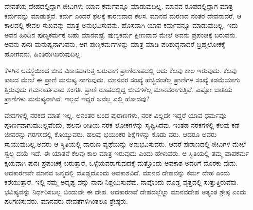 ದೇವತೆಯ ದೇಹದಲ್ಲಿದ್ದಾಗ ಜೀವಿಗಳು ಯಾವ ಕರ್ಮವನ್ನೂ ಮಾಡುವುದಿಲ್ಲ. ಮಾನವ ರೂಪದಲ್ಲಿದ್ದಾಗ ಮಾತ್ರ ಕರ್ಮವನ್ನು ಮಾಡುತ್ತವೆ. ಕರ್ಮ ಎಂದರೆ ಫಲಕ್ಕೆ ಕಾರಣವಾದ ಕೆಲಸ. ಮಾನವ ಮರಣದ ನಂತರ ದೇವನಾದರೆ, ಆ ಕಾಲದಲ್ಲಿ ಕೇವಲ ಸುಖವನ್ನು ಮಾತ್ರ ಅನುಭವಿಸುವನು. ಹೊಸದಾಗಿ ಯಾವ ಕರ್ಮವನ್ನೂ ಮಾಡುವುದಿಲ್ಲ. ಇದು ಅವನ ಹಿಂದಿನ ಪುಣ್ಯಕರ್ಮಕ್ಕೆ ಬಹು ಮಾನವಷ್ಟೆ. ಪುಣ್ಯಕರ್ಮ ಕ್ಷೀಣವಾದ ಮೇಲೆ ಅವನು ಪ್ರಪಂಚಕ್ಕೆ ಬರುವನು. ಅವನು ಪುನಃ ಮನುಷ್ಯನಾಗುವನು, ಆಗ ಪುಣ್ಯಕರ್ಮಗಳನ್ನು ಮಾತ್ರ ಮಾಡಿ ಪರಿಶುದ್ಧನಾದರೆ ಬ್ರಹ್ಮಲೋಕಕ್ಕೆ ಹೋಗವನು, ಹಿಂತಿರುಗಿಬರುವುದಿಲ್ಲ.

ಕೆಳಗಿನ ಅವಸ್ಥೆಯಿಂದ ಜೀವ ವಿಕಾಸವಾಗುತ್ತ ಬರುವಾಗ ಪ್ರಾಣಿರೂಪದಲ್ಲಿ ಅದು ಕೆಲವು ಕಾಲ ಇರುವುದು. ಕೆಲವು ಕಾಲದ ಮೇಲೆ ಈ ಪ್ರಾಣಿ ಮನುಷ್ಯ ನಾಗುವುದು. ಮಾನವರ ಸಂಖ್ಯೆ ಹೆಚ್ಚಿದಂತೆಲ್ಲ ಪ್ರಾಣಿಗಳ ಸಂಖ್ಯೆ ಕಡಮೆಯಾಗು ತ್ತಿರುವುದು ಗಮನಾರ್ಹವಾದ ಸಂಗತಿ. ಪ್ರಾಣಿ ರೂಪದಲ್ಲಿದ್ದ ಜೀವಗಳೆಲ್ಲ ಮಾನವರಾಗುತ್ತಿವೆ. ಎಷ್ಟೋ ಜಾತಿಯ ಪ್ರಾಣಿಗಳು ಮನುಷ್ಯರಾಗಿವೆ. ಇಲ್ಲದೆ ಇದ್ದರೆ ಅವೆಲ್ಲ ಎಲ್ಲಿ ಹೋದವು?

ವೇದಗಳಲ್ಲಿ ನರಕದ ಮಾತೆ ಇಲ್ಲ. ಅನಂತರ ಬಂದ ಪುರಾಣಗಳು, ನರಕ ವಿಲ್ಲದೇ ಇದ್ದರೆ ಯಾವ ಧರ್ಮವೂ ಪೂರ್ಣವಾಗುವುದಿಲ್ಲವೆಂದು, ಹಲವು ರೀತಿಯ ನರಕ ಲೋಕಗಳನ್ನು ಸೃಷ್ಟಿಸಿದವು. ಇಂತಹ ನರಕಗಳಲ್ಲಿ ಕೆಲವು ಕಡೆ ಜೀವರನ್ನು ಗರಗಸದಲ್ಲಿ ಕೊಯ್ಯುವರು, ಹಲವು ಭಯಂಕರ ಶಿಕ್ಷೆಗಳನ್ನು ಕೊಡು ವರು. ಆದರೂ ಅವರು ಸಾಯುವುದಿಲ್ಲ.ಅವರು ಆ ಸ್ಥಿತಿಯಲ್ಲಿ ದಾರುಣ ವ್ಯಥೆಯನ್ನು ಅನುಭವಿಸುವರು. ಆದರೆ ಪುರಾಣದಲ್ಲಿ ಜೀವಿಗಳ ಮೇಲೆ ಸ್ವಲ್ಪ ದಯೆ ಇದೆ. ಈ ಯಾತನೆ ಕೆಲವು ಕಾಲ ಮಾತ್ರ ಇರುವುದು ಎಂದು ಹೇಳುವರು. ಆ ಸ್ಥಿತಿಯಲ್ಲಿ ತಮ್ಮ ಪಾಪಕರ್ಮ ಕ್ಷಯವಾಗಿ ಪುನಃ ಪ್ರಪಂಚಕ್ಕೆ ಬರುತ್ತಾರೆ, ಒಳ್ಳೆಯವರಾಗುವುದಕ್ಕೆ ಮತ್ತೊಂದು ಅವಕಾಶ ಅವರಿಗೆ ದೊರಕು ವುದು. ಆದಕಾರಣವೇ ಮಾನವ ಜನ್ಮದಲ್ಲಿ ದೊಡ್ಡದೊಂದು ಅವಕಾಶವಿದೆ. ಮಾನವ ದೇಹವನ್ನು ಕರ್ಮ ದೇಹ ಎಂದು ಕರೆಯುತ್ತಾರೆ. ಇಲ್ಲಿ ನಮ್ಮ ಅದೃಷ್ಟ ವನ್ನು ನಾವು ನಿಶ್ಚಯಿಸುವೆವು. ನಾವೊಂದು ದೊಡ್ಡ ವೃತ್ತದಲ್ಲಿ ಸುತ್ತುತ್ತಿರುವೆವು. ಭವಿಷ್ಯವನ್ನು ನಿರ್ಧರಿಸಬಲ್ಲ ಬಿಂದುವೇ ಈ ದೇಹ. ಆದಕಾರಣವೆ ದೇಹದಲ್ಲೆಲ್ಲಾ ಮಾನವದೇಹ ಅತ್ಯಂತ ಶ್ರೇಷ್ಠ ಎಂದು ಪರಿಗಣಿಸುವರು. ಮಾನವರು ದೇವತೆಗಳಿಗಿಂತಲೂ ಶ್ರೇಷ್ಠರು.

